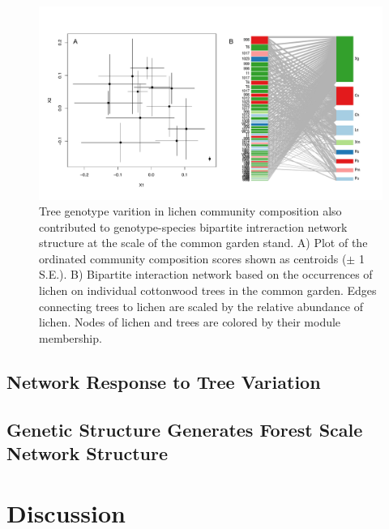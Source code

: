 \documentclass[fleqn,10pt]{wlscirep}
\begin{document}
\begin{figure}
\centering
\includegraphics[width = \textwidth]{lcn_com_bpnet.pdf}
\caption{Tree genotype varition in lichen community composition also
  contributed to genotype-species bipartite intreraction network
  structure at the scale of the common garden stand. A) Plot of the
  ordinated community composition scores shown as centroids ($\pm$ 1
  S.E.). B) Bipartite interaction network based on the occurrences of
  lichen on individual cottonwood trees in the common garden. Edges
  connecting trees to lichen are scaled by the relative abundance of
  lichen. Nodes of lichen and trees are colored by their module
  membership.}
\label{fig:bpnet}
\end{figure}





\subsection*{Network Response to Tree Variation}


\subsection*{Genetic Structure Generates Forest Scale Network Structure}


\clearpage
\newpage


\section*{Discussion}




\end{document}
